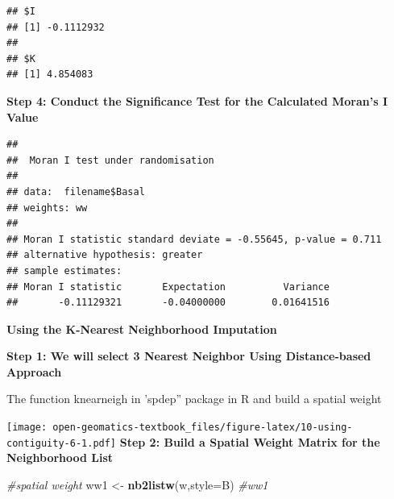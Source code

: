 \documentclass[
]{book}
\newenvironment{Shaded}{\begin{snugshade}}{\end{snugshade}}
\newcommand{\AttributeTok}[1]{\textcolor[rgb]{0.13,0.29,0.53}{#1}}
\newcommand{\CommentTok}[1]{\textcolor[rgb]{0.56,0.35,0.01}{\textit{#1}}}
\newcommand{\DecValTok}[1]{\textcolor[rgb]{0.00,0.00,0.81}{#1}}
\newcommand{\FunctionTok}[1]{\textcolor[rgb]{0.13,0.29,0.53}{\textbf{#1}}}
\newcommand{\NormalTok}[1]{#1}
\newcommand{\OtherTok}[1]{\textcolor[rgb]{0.56,0.35,0.01}{#1}}
\newcommand{\SpecialCharTok}[1]{\textcolor[rgb]{0.81,0.36,0.00}{\textbf{#1}}}
\newcommand{\StringTok}[1]{\textcolor[rgb]{0.31,0.60,0.02}{#1}}
\begin{document}
\begin{verbatim}
## $I
## [1] -0.1112932
## 
## $K
## [1] 4.854083
\end{verbatim}

\textbf{Step 4: Conduct the Significance Test for the Calculated Moran's I Value}

\begin{Shaded}
\end{Shaded}

\begin{verbatim}
## 
##  Moran I test under randomisation
## 
## data:  filename$Basal  
## weights: ww    
## 
## Moran I statistic standard deviate = -0.55645, p-value = 0.711
## alternative hypothesis: greater
## sample estimates:
## Moran I statistic       Expectation          Variance 
##       -0.11129321       -0.04000000        0.01641516
\end{verbatim}

\textbf{Using the K-Nearest Neighborhood Imputation}

\textbf{Step 1: We will select 3 Nearest Neighbor Using Distance-based Approach}

The function knearneigh in 'spdep'' package in R and build a spatial weight

\begin{Shaded}
\end{Shaded}

\texttt{[image: open-geomatics-textbook\_files/figure-latex/10-using-contiguity-6-1.pdf]}
\textbf{Step 2: Build a Spatial Weight Matrix for the Neighborhood List}

\begin{Shaded}
\begin{Highlighting}[]
\CommentTok{\#spatial weight }
\NormalTok{ww1 }\OtherTok{\textless{}{-}} \FunctionTok{nb2listw}\NormalTok{(w,}\AttributeTok{style=}\StringTok{\textquotesingle{}B\textquotesingle{}}\NormalTok{)}
\CommentTok{\#ww1}
\end{Highlighting}
\end{Shaded}
\end{document}
